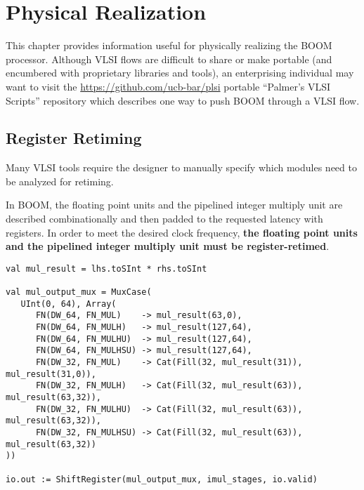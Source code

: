 \chapter{Physical Realization}\label{chapter:physical}

This chapter provides information useful for physically realizing the BOOM processor.  Although VLSI flows are difficult to share or make portable (and encumbered with proprietary libraries and tools), an enterprising individual may want to visit the \url{https://github.com/ucb-bar/plsi} portable ``Palmer's VLSI Scripts'' repository which describes one way to push BOOM through a VLSI flow.

\section{Register Retiming}
 
Many VLSI tools require the designer to manually specify which modules need to
be analyzed for retiming. 
                 
In BOOM, the floating point units and the pipelined integer multiply unit are
described combinationally and then padded to the requested latency with
registers.
In order to meet the desired clock frequency,  {\bf the floating point units and the
pipelined integer multiply unit must be register-retimed}.
 
\begin{center}
\begin{minipage}{0.90\textwidth}
\begin{lstlisting}[caption=Pipelined integer multiply unit requires register retiming to be realized properly.]
val mul_result = lhs.toSInt * rhs.toSInt
                                                                               
val mul_output_mux = MuxCase(                                                  
   UInt(0, 64), Array(                                                         
      FN(DW_64, FN_MUL)    -> mul_result(63,0),                                
      FN(DW_64, FN_MULH)   -> mul_result(127,64),                              
      FN(DW_64, FN_MULHU)  -> mul_result(127,64),                              
      FN(DW_64, FN_MULHSU) -> mul_result(127,64),                              
      FN(DW_32, FN_MUL)    -> Cat(Fill(32, mul_result(31)), mul_result(31,0)), 
      FN(DW_32, FN_MULH)   -> Cat(Fill(32, mul_result(63)), mul_result(63,32)),
      FN(DW_32, FN_MULHU)  -> Cat(Fill(32, mul_result(63)), mul_result(63,32)),
      FN(DW_32, FN_MULHSU) -> Cat(Fill(32, mul_result(63)), mul_result(63,32)) 
))                                                                             
                                                                               
io.out := ShiftRegister(mul_output_mux, imul_stages, io.valid)
\end{lstlisting}\label{code:imul}
\end{minipage}
\end{center}

